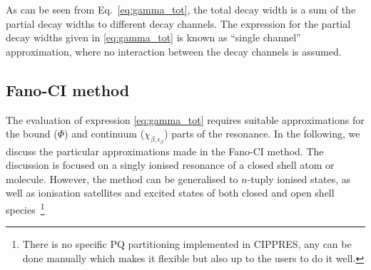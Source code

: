 \documentclass[a4paper, 10 pt]{report}
\begin{document}
As can be seen from Eq.~\eqref{eq:gamma_tot}, the total decay width is a sum of 
the partial decay widths to different decay channels. The expression for the 
partial decay widths given in \eqref{eq:gamma_tot} is known as ``single 
channel'' approximation, where no interaction between the decay channels is 
assumed. 


\subsection{Fano-CI method}\label{ssec:fanoci}

The evaluation of expression \eqref{eq:gamma_tot} requires suitable 
approximations for the bound ($\Phi$) and continuum ($\chi_{\beta, \epsilon_
	{\beta}}$) parts of the resonance. In the following, we discuss the particular 
approximations made in the Fano-CI method. The discussion is focused on a singly 
ionised resonance of a closed shell atom or molecule. However, the method can be 
generalised to $n$-tuply ionised states, as well as ionisation satellites and 
excited states of both closed and open shell species~\footnote{There is no specific PQ partitioning implemented in CIPPRES, any can be done manually which makes it flexible but also up to the users to do it well.} 
\end{document}
